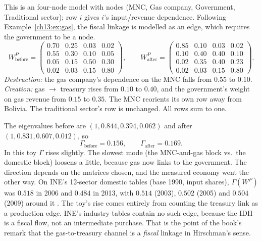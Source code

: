 \documentclass[../solutions_manual.tex]{subfiles}
\begin{document}
 This is an \illustrative{} four-node model with nodes (MNC, Gas company, Government, Traditional sector); row $i$ gives $i$'s input/revenue dependence. Following Example~\ref{ch13:ex:gas}, the fiscal linkage is modelled as an edge, which requires the government to be a node.
\[
W^P_{\text{before}} = \begin{pmatrix} 0.70 & 0.25 & 0.03 & 0.02 \\ 0.55 & 0.30 & 0.10 & 0.05 \\ 0.05 & 0.15 & 0.50 & 0.30 \\ 0.02 & 0.03 & 0.15 & 0.80 \end{pmatrix},\qquad
W^P_{\text{after}} = \begin{pmatrix} 0.85 & 0.10 & 0.03 & 0.02 \\ 0.10 & 0.40 & 0.40 & 0.10 \\ 0.02 & 0.35 & 0.40 & 0.23 \\ 0.02 & 0.03 & 0.15 & 0.80 \end{pmatrix}.
\]
\emph{Destruction:} the gas company's dependence on the MNC falls from $0.55$ to $0.10$. \emph{Creation:} gas $\to$ treasury rises from $0.10$ to $0.40$, and the government's weight on gas revenue from $0.15$ to $0.35$. The MNC reorients its own row away from Bolivia. The traditional sector's row is unchanged. All rows sum to one.

 The eigenvalues before are $(1, 0.844, 0.394, 0.062)$ and after $(1, 0.831, 0.607, 0.012)$, so
\[
\Gamma_{\text{before}} = 0.156, \qquad \Gamma_{\text{after}} = 0.169 .
\]
In this toy $\Gamma$ rises slightly. The slowest mode (the MNC-and-gas block vs.\ the domestic block) loosens a little, because gas now links to the government. The direction depends on the matrices chosen, and the measured economy went the other way. On INE's 12-sector domestic tables (base 1990, input shares), $\Gamma(W^P)$ was $0.518$ in 2006 and $0.484$ in 2013, with $0.514$ (2003), $0.502$ (2005) and $0.504$ (2009) around it \citep{ine2026sut}. The toy's rise comes entirely from counting the treasury link as a production edge. INE's industry tables contain no such edge, because the IDH is a fiscal flow, not an intermediate purchase. That is the point of the book's remark that the gas-to-treasury channel is a \emph{fiscal} linkage in Hirschman's sense.
\end{document}
